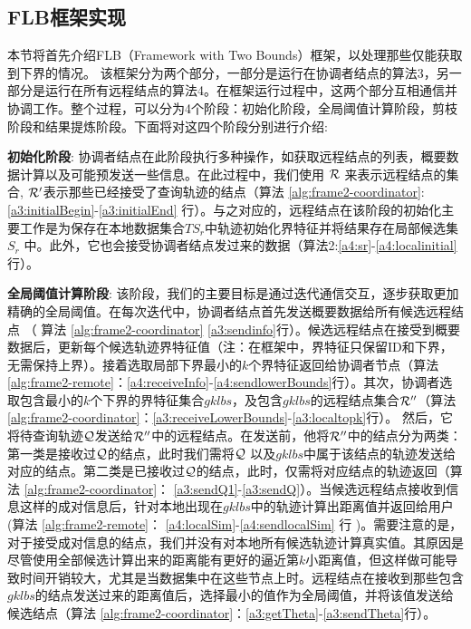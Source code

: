 \subsection{FLB框架实现}

本节将首先介绍FLB（Framework with Two Bounds）框架，以处理那些仅能获取到下界的情况。
该框架分为两个部分，一部分是运行在协调者结点的算法3，另一部分是运行在所有远程结点的算法4。在框架运行过程中，这两个部分互相通信并协调工作。整个过程，可以分为4个阶段：初始化阶段，全局阈值计算阶段，剪枝阶段和结果提炼阶段。下面将对这四个阶段分别进行介绍:




\textbf{初始化阶段}: 协调者结点在此阶段执行多种操作，如获取远程结点的列表，概要数据计算以及可能预发送一些信息。在此过程中，我们使用
$\cal R$ 来表示远程结点的集合, ${\cal R}'$表示那些已经接受了查询轨迹的结点（算法 \ref{alg:frame2-coordinator}:\ref{a3:initialBegin}-\ref{a3:initialEnd}  行）。与之对应的，远程结点在该阶段的初始化主要工作是为保存在本地数据集合$TS_{r}$中轨迹初始化界特征并将结果存在局部候选集$S_{r}$ 中。此外，它也会接受协调者结点发过来的数据（算法2:\ref{a4:sr}-\ref{a4:localinitial}行）。

\textbf{全局阈值计算阶段}: 该阶段，我们的主要目标是通过迭代通信交互，逐步获取更加精确的全局阈值。在每次迭代中，协调者结点首先发送概要数据给所有候选远程结点
   （ 算法 \ref{alg:frame2-coordinator} \ref{a3:sendinfo}行）。候选远程结点在接受到概要数据后，更新每个候选轨迹界特征值（注：在框架中，界特征只保留ID和下界，无需保持上界）。接着选取局部下界最小的$k$个界特征返回给协调者节点（算法 \ref{alg:frame2-remote}：\ref{a4:receiveInfo}-\ref{a4:sendlowerBounds}行）。其次，协调者选取包含最小的$k$个下界的界特征集合$gklbs$，及包含$gklbs$的远程结点集合${\cal R}''$（算法 \ref{alg:frame2-coordinator}：\ref{a3:receiveLowerBounds}-\ref{a3:localtopk}行）。
   然后，它将待查询轨迹$\cal Q$发送给${\cal R}''$中的远程结点。在发送前，他将${\cal R}''$中的结点分为两类：第一类是接收过$\cal Q$的结点，此时我们需将$\cal Q$ 以及$gklbs$中属于该结点的轨迹发送给对应的结点。第二类是已接收过$\cal Q$的结点，此时，仅需将对应结点的轨迹返回（算法 \ref{alg:frame2-coordinator}：
    \ref{a3:sendQ1}-\ref{a3:sendQ}）。当候选远程结点接收到信息这样的成对信息后，针对本地出现在$gklbs$中的轨迹计算出距离值并返回给用户(算法 \ref{alg:frame2-remote}： \ref{a4:localSim}-\ref{a4:sendlocalSim} 行 )。需要注意的是，对于接受成对信息的结点，我们并没有对本地所有候选轨迹计算真实值。其原因是尽管使用全部候选计算出来的距离能有更好的逼近第$k$小距离值，但这样做可能导致时间开销较大，尤其是当数据集中在这些节点上时。远程结点在接收到那些包含$gklbs$的结点发送过来的距离值后，选择最小的值作为全局阈值，并将该值发送给候选结点（算法 \ref{alg:frame2-coordinator}：\ref{a3:getTheta}-\ref{a3:sendTheta}行）。
    
